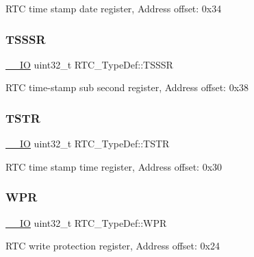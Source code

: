 R\+TC time stamp date register, Address offset\+: 0x34 \mbox{\label{struct_r_t_c___type_def_a1e8b4b987496ee1c0c6f16b0a94ea1a1}} 
\subsubsection{\texorpdfstring{T\+S\+S\+SR}{TSSSR}}
{\footnotesize\ttfamily \hyperlink{core__sc300_8h_aec43007d9998a0a0e01faede4133d6be}{\+\_\+\+\_\+\+IO} uint32\+\_\+t R\+T\+C\+\_\+\+Type\+Def\+::\+T\+S\+S\+SR}

R\+TC time-\/stamp sub second register, Address offset\+: 0x38 \mbox{\label{struct_r_t_c___type_def_a1ddbb2a5eaa54ff43835026dec99ae1c}} 
\subsubsection{\texorpdfstring{T\+S\+TR}{TSTR}}
{\footnotesize\ttfamily \hyperlink{core__sc300_8h_aec43007d9998a0a0e01faede4133d6be}{\+\_\+\+\_\+\+IO} uint32\+\_\+t R\+T\+C\+\_\+\+Type\+Def\+::\+T\+S\+TR}

R\+TC time stamp time register, Address offset\+: 0x30 \mbox{\label{struct_r_t_c___type_def_ad54765af56784498a3ae08686b79a1ff}} 
\subsubsection{\texorpdfstring{W\+PR}{WPR}}
{\footnotesize\ttfamily \hyperlink{core__sc300_8h_aec43007d9998a0a0e01faede4133d6be}{\+\_\+\+\_\+\+IO} uint32\+\_\+t R\+T\+C\+\_\+\+Type\+Def\+::\+W\+PR}

R\+TC write protection register, Address offset\+: 0x24 \mbox{\label{struct_r_t_c___type_def_ad93017bb0a778a2aad9cd71211fc770a}} 
